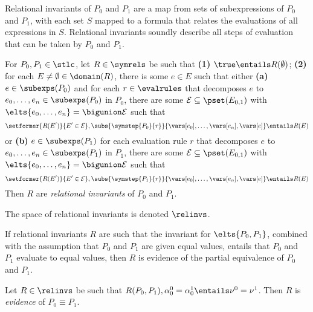Relational invariants of $P_0$ and $P_1$ are a map from sets of
subexpressions of $P_0$ and $P_1$, with each set $S$ mapped to a
formula that relates the evaluations of all expressions in $S$.
%
Relational invariants soundly describe all steps of evaluation that
can be taken by $P_0$ and $P_1$.
\begin{defn}
  \label{defn:rel-invs}
  For $P_0, P_1 \in \stlc$, let $R \in \symrels$ be such that %
  \textbf{(1)} $\true \entails R(\emptyset)$;
  \textbf{(2)} for each $E \not= \emptyset \in \domain(R)$, %
  there is some $e \in E$ such that either %
  \textbf{(a)} $e \in \subexps(P_0)$ and for each $r \in
  \evalrules$ that decomposes $e$ to $e_0, \ldots, e_n \in
  \subexps(P_0)$ in $P_0$,
  there are some $\mathcal{E} \subseteq \pset(E_{0, 1})$ with $\elts{
    e_0, \ldots, e_n } = \bigunion \mathcal{E}$ such that
  \[ \setformer{ R(E') }{ E' \in \mathcal{E} }, %
  \subs{ \symstep{P_0}{ r } }{ %
    \vars[ e_0 ], \ldots, \vars[ e_n ], \vars[ e ] } %
  \entails R(E)
  \]
  or
  \textbf{(b)} $e \in \subexps(P_1)$ for each evaluation rule $r$ that
  decomposes $e$
  to $e_0, \ldots, e_n \in \subexps(P_1)$ in $P_1$,
  there are some $\mathcal{E} \subseteq \pset(E_{0, 1})$ with $\elts{
    e_0, \ldots, e_n } = \bigunion \mathcal{E}$ such that
  \[ \setformer{ R(E') }{ E' \in \mathcal{E} }, %
  \subs{ \symstep{P_1}{ r } }{ %
    \vars[ e_0 ], \ldots, \vars[ e_n ], \vars[ e ] } %
  \entails R(E)
  \]
  Then $R$ are \emph{relational invariants} of $P_0$ and $P_1$.
\end{defn}
%
The space of relational invariants is denoted $\relinvs$.

If relational invariants $R$ are such that the invariant for $\elts{
  P_0, P_1 }$, combined with the assumption that $P_0$ and $P_1$ are
given equal values, entails that $P_0$ and $P_1$ evaluate to equal
values, then $R$ is evidence of the partial equivalence of $P_0$ and
$P_1$.
%
\begin{defn}
  \label{defn:eq-pf}
  Let $R \in \relinvs$ be such that $R(P_0, P_1), \alpha^0_0 =
  \alpha^1_0 \entails \nu^0 = \nu^1$.
  Then $R$ is \emph{evidence} of $P_0 \equiv P_1$.
\end{defn}

\begin{ex}
  \label{ex:rel-invs}
\end{ex}

